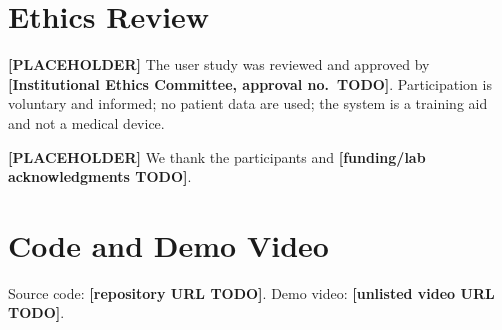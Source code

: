 \documentclass[sigconf]{acmart}
\begin{document}
\section*{Ethics Review}
\textbf{[PLACEHOLDER]} The user study was reviewed and approved by \textbf{[Institutional Ethics
Committee, approval no.\ TODO]}. Participation is voluntary and informed; no patient data are used;
the system is a training aid and not a medical device.

\begin{acks}
\textbf{[PLACEHOLDER]} We thank the participants and \textbf{[funding/lab acknowledgments TODO]}.
\end{acks}

\section*{Code and Demo Video}
Source code: \textbf{[repository URL TODO]}. Demo video: \textbf{[unlisted video URL TODO]}.



\end{document}
